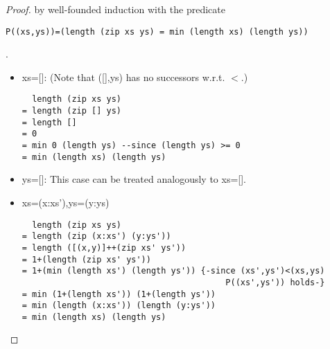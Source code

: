 \documentclass[]{article}
\theoremstyle{definition}
\begin{document}
\begin{proof} by well-founded induction with the predicate 
\begin{verbatim}
P((xs,ys))=(length (zip xs ys) = min (length xs) (length ys))
\end{verbatim}.
\begin{itemize}
\item[] xs=[]: (Note that ([],ys) has no successors w.r.t. $<$.)
\begin{verbatim}
  length (zip xs ys)
= length (zip [] ys)
= length []
= 0
= min 0 (length ys) --since (length ys) >= 0
= min (length xs) (length ys)
\end{verbatim}
\item[] ys=[]: This case can be treated analogously to xs=[].
\item[] xs=(x:xs'),ys=(y:ys)
\begin{verbatim}
  length (zip xs ys)
= length (zip (x:xs') (y:ys')) 
= length ([(x,y)]++(zip xs' ys'))
= 1+(length (zip xs' ys'))
= 1+(min (length xs') (length ys')) {-since (xs',ys')<(xs,ys) 
                                         P((xs',ys')) holds-}
= min (1+(length xs')) (1+(length ys'))
= min (length (x:xs')) (length (y:ys'))
= min (length xs) (length ys)
\end{verbatim}
\end{itemize}
\end{proof}
\newpage

\end{document}
